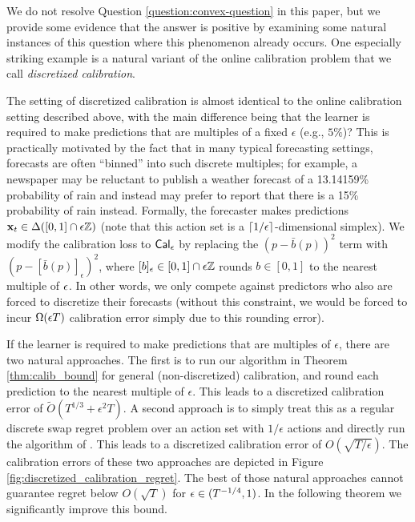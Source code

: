 \documentclass[final,12pt]{alt2025}
\begin{document}
We do not resolve Question \ref{question:convex-question} in this paper, but we provide some evidence that the answer is positive by examining some natural instances of this question where this phenomenon already occurs. One especially striking example is a natural variant of the online calibration problem that we call \emph{discretized calibration}.

The setting of discretized calibration is almost identical to the online calibration setting described above, with the main difference being that the learner is required to make predictions that are multiples of a fixed $\epsilon$ (e.g., $5\%$)? This is practically motivated by the fact that in many typical forecasting settings, forecasts are often ``binned'' into such discrete multiples; for example, a newspaper may be reluctant to publish a weather forecast of a 13.14159\% probability of rain and instead may prefer to report that there is a 15\% probability of rain instead. Formally, the forecaster makes predictions $\mathbf{x}_t \in \Delta([0,1] \cap \epsilon \mathbb{Z})$ (note that this action set is a $\lceil 1/\epsilon \rceil$-dimensional simplex). We modify the calibration loss to $\operatorname{\mathsf{Cal}}_\epsilon$ by replacing the $(p - \bar b(p))^2$ term with  $(p - [\bar b(p)]_{\epsilon})^2$, where $[b]_\epsilon \in [0,1] \cap \epsilon \mathbb{Z}$ rounds $b \in [0,1]$ to the nearest multiple of $\epsilon$. In other words, we only compete against predictors who also are forced to discretize their forecasts (without this constraint, we would be forced to incur $\Omega(\epsilon T)$ calibration error simply due to this rounding error). 

If the learner is required to make predictions that are multiples of $\epsilon$, there are two natural approaches. The first is to run our algorithm in Theorem \ref{thm:calib_bound} for general (non-discretized) calibration, and round each prediction to the nearest multiple of $\epsilon$. This leads to a discretized calibration error of  $\tilde{O}(T^{1/3} + \epsilon^2 T)$. A second approach is to simply treat this as a regular discrete swap regret problem over an action set with $1/\epsilon$ actions and directly run the algorithm of \cite{blum2007external}. This leads to a discretized calibration error of $O(\sqrt{T / \epsilon})$. The calibration errors of these two approaches are depicted in Figure \ref{fig:discretized_calibration_regret}. The best of those natural approaches cannot guarantee regret below $O(\sqrt{T})$ for $\epsilon \in (T^{-1/4},1)$. In the following theorem we significantly improve this bound.
\end{document}
